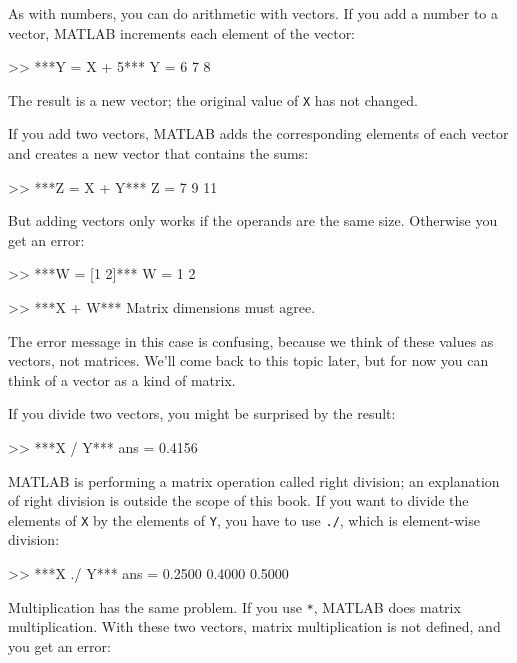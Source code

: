 As with numbers, you can do arithmetic with vectors.  If you add a number
to a vector, MATLAB increments each element of the vector:

\begin{code}
>> ***Y = X + 5***
Y = 6     7     8
\end{code}

The result is a new vector; the original value of \lstinline{X} has not
changed.

If you add two vectors, MATLAB adds the corresponding elements of each
vector and creates a new vector that contains the sums:

\begin{code}
>> ***Z = X + Y***
Z = 7     9    11
\end{code}

But adding vectors only works if the operands are the same size.
Otherwise you get an error:

\begin{code}
>> ***W = [1 2]***
W = 1     2     

>> ***X + W***
Matrix dimensions must agree.
\end{code}

The error message in this case is confusing, because we think of these values as vectors, not matrices.
We'll come back to this topic later, but for now you can think of a vector as a kind of matrix.


If you divide two vectors, you might be surprised by the result:

\begin{code}
>> ***X / Y***
ans = 0.4156
\end{code}

MATLAB is performing a matrix operation called right division; an explanation of right division is outside the scope of this book. If you want to divide the elements of \lstinline{X} by the elements of \lstinline{Y}, you have to use \lstinline{./}, which is element-wise division:

\begin{code}
>> ***X ./ Y***
ans = 0.2500    0.4000    0.5000
\end{code}

Multiplication has the same problem.  If you use \lstinline{*}, MATLAB does matrix multiplication.  With these two vectors, matrix multiplication is not defined, and you get an error:

